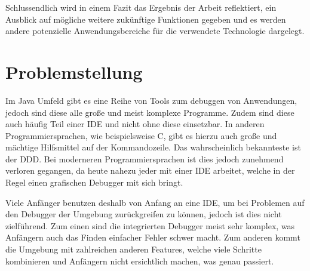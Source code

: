 Schlussendlich wird in einem Fazit das Ergebnis der Arbeit reflektiert, ein Ausblick auf mögliche weitere zukünftige Funktionen gegeben und es werden andere potenzielle Anwendungsbereiche für die verwendete Technologie dargelegt.

\section{Problemstellung} 

Im Java Umfeld gibt es eine Reihe von Tools zum debuggen von Anwendungen, jedoch sind diese alle große und meist komplexe Programme. Zudem sind diese auch häufig Teil einer \ac{IDE} und nicht ohne diese einsetzbar.
In anderen Programmiersprachen, wie beispielsweise C, gibt es hierzu auch große und mächtige Hilfsmittel auf der Kommandozeile. Das wahrscheinlich bekannteste ist der \ac{DDD}. Bei moderneren Programmiersprachen ist dies jedoch zunehmend verloren gegangen, da heute nahezu jeder mit einer \ac{IDE} arbeitet, welche in der Regel einen grafischen Debugger mit sich bringt.

Viele Anfänger benutzen deshalb von Anfang an eine \ac{IDE}, um bei Problemen auf den Debugger der Umgebung zurückgreifen zu können, jedoch ist dies nicht zielführend. Zum einen sind die integrierten Debugger meist sehr komplex, was Anfängern auch das Finden einfacher Fehler schwer macht. Zum anderen kommt die Umgebung mit zahlreichen anderen Features, welche viele Schritte kombinieren und Anfängern nicht ersichtlich machen, was genau passiert.